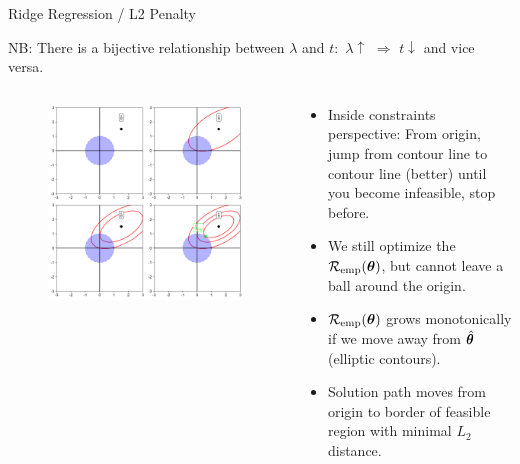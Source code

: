 \documentclass[11pt,compress,t,notes=noshow, xcolor=table]{beamer}
\begin{document}
\begin{vbframe}{Ridge Regression / L2 Penalty}
\begin{footnotesize} 
NB: There is a bijective relationship between $\lambda$ and $t$: $\, \lambda \uparrow \,\, \Rightarrow \,\, t \downarrow$ and vice versa.
\end{footnotesize}

\framebreak

\begin{columns}
\begin{column}{0.5\textwidth}
\lz
\begin{figure}
\includegraphics[width=\textwidth]{figure/ridge_perspectives_02.png}
\end{figure}
\end{column}

\begin{column}{0.5\textwidth}
\begin{footnotesize} 
\lz \lz
\begin{itemize}
  \item Inside constraints perspective: From origin, jump from contour line to contour line (better) until you become infeasible, stop before.
  \item We still optimize the $\mathcal{R}_{\text{emp}}(\bm{\theta})$, but cannot leave a ball around the origin.
  \item $\mathcal{R}_{\text{emp}}(\bm{\theta})$ grows monotonically if we move away from $\hat{\bm{\theta}}$ (elliptic contours).
  \item Solution path moves from origin to border of feasible region with minimal $L_2$ distance.
\end{itemize}
\end{footnotesize}
\end{column}
\end{columns}



\end{vbframe}
\end{document}
